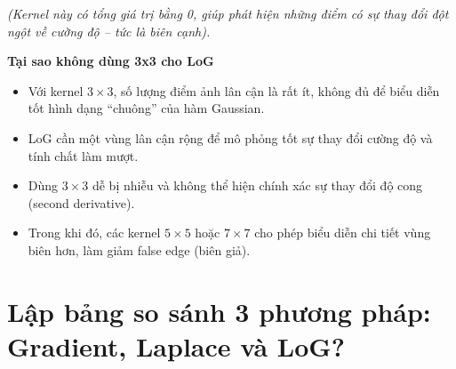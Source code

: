 \documentclass[12pt]{article}
\begin{document}
	\textit{(Kernel này có tổng giá trị bằng 0, giúp phát hiện những điểm có sự thay đổi đột ngột về cường độ – tức là biên cạnh).}
	
	\textbf{Tại sao không dùng 3x3 cho LoG}
	
	\begin{itemize}
	\item Với kernel $3 \times 3$, số lượng điểm ảnh lân cận là rất ít, không đủ để biểu diễn tốt hình dạng “chuông” của hàm Gaussian.
	\item LoG cần một vùng lân cận rộng để mô phỏng tốt sự thay đổi cường độ và tính chất làm mượt.
	\item Dùng $3 \times 3$ dễ bị nhiễu và không thể hiện chính xác sự thay đổi độ cong (second derivative).
	\item Trong khi đó, các kernel $5 \times 5$ hoặc $7 \times 7$ cho phép biểu diễn chi tiết vùng biên hơn, làm giảm false edge (biên giả).
	\end{itemize}
	
	\section{Lập bảng so sánh 3 phương pháp: Gradient, Laplace và LoG?}
	
\end{document}
